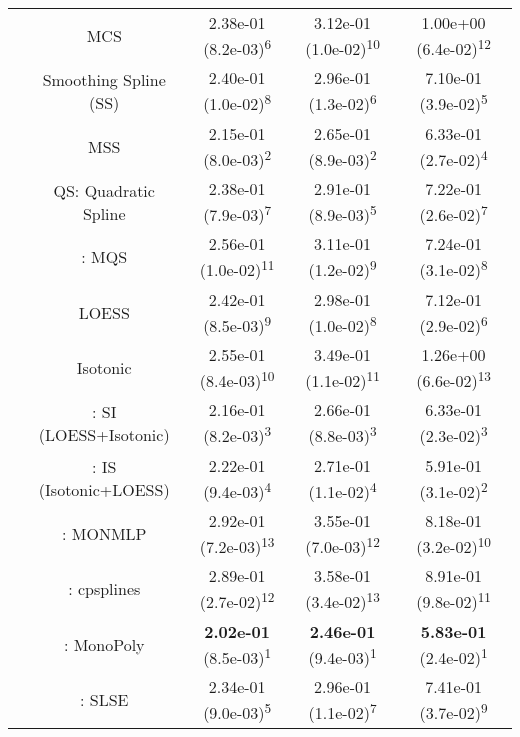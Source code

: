 \begin{tabular}{ccccc}
&MCS& 2.38e-01 (8.2e-03)\textsuperscript{6}& 3.12e-01 (1.0e-02)\textsuperscript{10}& 1.00e+00 (6.4e-02)\textsuperscript{12}\tabularnewline
&Smoothing Spline (SS)& 2.40e-01 (1.0e-02)\textsuperscript{8}& 2.96e-01 (1.3e-02)\textsuperscript{6}& 7.10e-01 (3.9e-02)\textsuperscript{5}\tabularnewline
&MSS& 2.15e-01 (8.0e-03)\textsuperscript{2}& 2.65e-01 (8.9e-03)\textsuperscript{2}& 6.33e-01 (2.7e-02)\textsuperscript{4}\tabularnewline
&QS: Quadratic Spline& 2.38e-01 (7.9e-03)\textsuperscript{7}& 2.91e-01 (8.9e-03)\textsuperscript{5}& 7.22e-01 (2.6e-02)\textsuperscript{7}\tabularnewline
&\textcite{heMonotoneBsplineSmoothing1998}: MQS& 2.56e-01 (1.0e-02)\textsuperscript{11}& 3.11e-01 (1.2e-02)\textsuperscript{9}& 7.24e-01 (3.1e-02)\textsuperscript{8}\tabularnewline
&LOESS& 2.42e-01 (8.5e-03)\textsuperscript{9}& 2.98e-01 (1.0e-02)\textsuperscript{8}& 7.12e-01 (2.9e-02)\textsuperscript{6}\tabularnewline
&Isotonic& 2.55e-01 (8.4e-03)\textsuperscript{10}& 3.49e-01 (1.1e-02)\textsuperscript{11}& 1.26e+00 (6.6e-02)\textsuperscript{13}\tabularnewline
&\textcite{mammenEstimatingSmoothMonotone1991}: SI (LOESS+Isotonic)& 2.16e-01 (8.2e-03)\textsuperscript{3}& 2.66e-01 (8.8e-03)\textsuperscript{3}& 6.33e-01 (2.3e-02)\textsuperscript{3}\tabularnewline
&\textcite{mammenEstimatingSmoothMonotone1991}: IS (Isotonic+LOESS)& 2.22e-01 (9.4e-03)\textsuperscript{4}& 2.71e-01 (1.1e-02)\textsuperscript{4}& 5.91e-01 (3.1e-02)\textsuperscript{2}\tabularnewline
&\textcite{cannonMonmlpMultilayerPerceptron2017}: MONMLP& 2.92e-01 (7.2e-03)\textsuperscript{13}& 3.55e-01 (7.0e-03)\textsuperscript{12}& 8.18e-01 (3.2e-02)\textsuperscript{10}\tabularnewline
&\textcite{navarro-garciaConstrainedSmoothingOutofrange2023}: cpsplines& 2.89e-01 (2.7e-02)\textsuperscript{12}& 3.58e-01 (3.4e-02)\textsuperscript{13}& 8.91e-01 (9.8e-02)\textsuperscript{11}\tabularnewline
&\textcite{murrayFastFlexibleMethods2016a}: MonoPoly& \textbf{2.02e-01} (8.5e-03)\textsuperscript{1}& \textbf{2.46e-01} (9.4e-03)\textsuperscript{1}& \textbf{5.83e-01} (2.4e-02)\textsuperscript{1}\tabularnewline
&\textcite{groeneboomConfidenceIntervalsMonotone2023}: SLSE& 2.34e-01 (9.0e-03)\textsuperscript{5}& 2.96e-01 (1.1e-02)\textsuperscript{7}& 7.41e-01 (3.7e-02)\textsuperscript{9}\tabularnewline
\bottomrule
\end{tabular}
